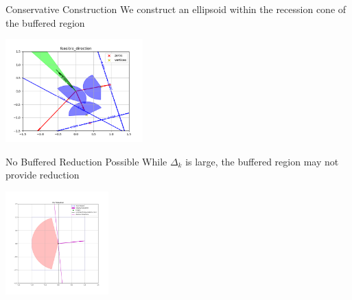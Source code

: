 \documentclass{beamer}
\newcommand{\dk}{{\Delta_k}}
\begin{document}
\begin{frame}{Conservative Construction}
	We construct an ellipsoid within the recession cone of the buffered region
	\begin{center}
		\includegraphics[width=200px]{images/feasible_direction.png}
	\end{center}
\end{frame}





\begin{frame}{No Buffered Reduction Possible}
	While $\Delta_k$ is large, the buffered region may not provide reduction
	\begin{center}
		\includegraphics[width=150px]{images/no_reduction.png}
	\end{center}
\end{frame}
\end{document}
